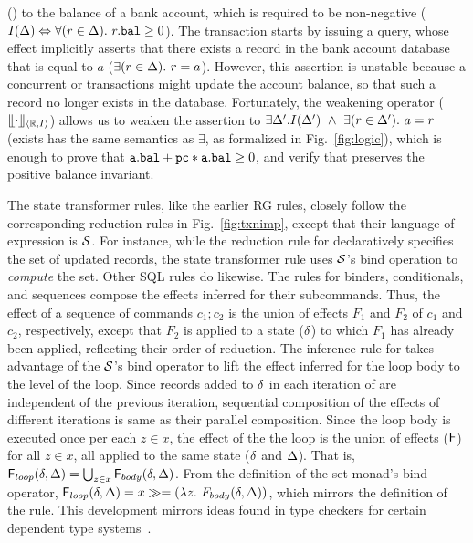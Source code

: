 () to the balance of a bank account, which is required to be
non-negative ($I(\Delta) \Leftrightarrow \forall(r\in\Delta).~r.{\tt bal}\ge
0$). The transaction starts by issuing a  query, whose
effect implicitly asserts that there exists a record in the bank
account database that is equal to $a$ ($\exists(r\in\Delta).~r=a$).
However, this assertion is unstable because a concurrent 
or  transactions might update the account balance, so that
such a record no longer exists in the database.  Fortunately, the
weakening operator ($\llfloor \cdot \rrfloor_{\langle \mathbb{R},I \rangle}$) allows us to weaken the
assertion to $\exists \Delta'.I(\Delta') ~\wedge~ \exists(r\in\Delta').~a=r$
({\sf exists} has the same semantics as $\exists$, as formalized in
Fig.~\ref{fig:logic}), which is enough to prove that ${\tt a.bal +
pc*a.bal}\ge 0$, and verify that  preserves the
positive balance invariant.

The state transformer rules, like the earlier RG rules, closely follow
the corresponding reduction rules in Fig.~\ref{fig:txnimp}, except
that their language of expression is $\mathcal{S}$. For instance, while the
reduction rule for  declaratively specifies the set of
updated records, the state transformer rule uses $\mathcal{S}$'s bind
operation to \emph{compute} the set. Other SQL rules do likewise. The
rules for  binders, conditionals, and sequences compose the
effects inferred for their subcommands. Thus, the effect of a sequence
of commands $c_1;c_2$ is the union of effects $F_1$ and $F_2$ of $c_1$
and $c_2$, respectively, except that $F_2$ is applied to a state
($\delta$) to which $F_1$ has already been applied, reflecting their
order of reduction. The inference rule for  takes advantage
of the $\mathcal{S}$'s bind operator to lift the effect inferred for the loop
body to the level of the loop. Since records added to $\delta$ in each
iteration of  are independent of the previous iteration,
sequential composition of the effects of different iterations is same
as their parallel composition. Since the loop body is executed once
per each $z\in x$, the effect of the the loop is the union of effects
(${\sf F}$) for all $z\in x$, all applied to the same state ($\delta$ and
$\Delta$). That is, ${\sf F}_{loop}(\delta,\Delta) = \bigcup_{z\in
  x}{\sf F}_{body}(\delta,\Delta)$. From the definition of the set monad's bind
operator, ${\sf F}_{loop}(\delta,\Delta) = x \gg= (\lambda
z.~F_{body}(\delta,\Delta))$, which mirrors the definition of the rule.
This development mirrors ideas found in type checkers for certain
dependent type systems~\cite{KJ14}.


